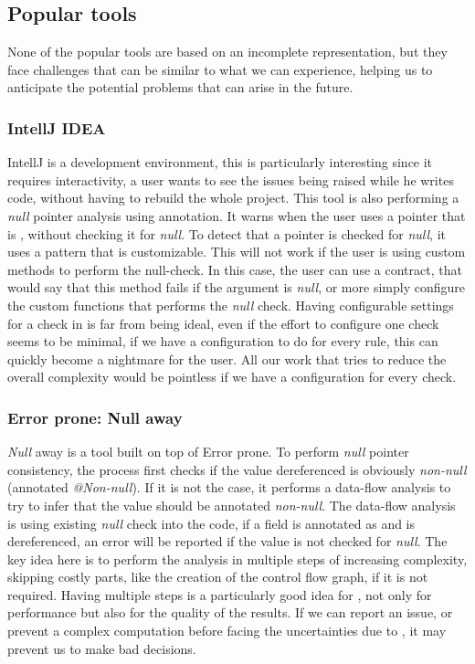 \subsection{Popular tools}
\label{subsec:other_tools_features}

None of the popular tools are based on an incomplete representation, but they face challenges that can be similar to what we can experience, helping us to anticipate the potential problems that can arise in the future.

\subsubsection{IntellJ IDEA}
\label{subsubsec:intellj_idea}

IntellJ is a development environment, this is particularly interesting since it requires interactivity, a user wants to see the issues being raised while he writes code, without having to rebuild the whole project. 
This tool is also performing a \emph{null} pointer analysis using annotation. 
It warns when the user uses a pointer that is \nullable{}, without checking it for \emph{null}. 
To detect that a pointer is checked for \emph{null}, it uses a pattern that is customizable. 
This will not work if the user is using custom methods to perform the null-check. 
In this case, the user can use a contract, that would say that this method fails if the argument is \emph{null}, or more simply configure the custom functions that performs the \emph{null} check.\newline
Having configurable settings for a check in \slang{} is far from being ideal, even if the effort to configure one check seems to be minimal, if we have a configuration to do for every rule, this can quickly become a nightmare for the user. 
All our work that tries to reduce the overall complexity would be pointless if we have a configuration for every check.


\subsubsection{Error prone: Null away}
\label{subsubsec:error_prone}

\emph{Null} away is a tool built on top of Error prone. 
To perform \emph{null} pointer consistency, the process first checks if the value dereferenced is obviously \emph{non-null} (annotated \emph{@Non-null}). 
If it is not the case, it performs a data-flow analysis to try to infer that the value should be annotated \emph{non-null}. 
The data-flow analysis is using existing \emph{null} check into the code, if a field is annotated as \nullable{} and is dereferenced, an error will be reported if the value is not checked for \emph{null}. \newline
The key idea here is to perform the analysis in multiple steps of increasing complexity, skipping costly parts, like the creation of the control flow graph, if it is not required.
Having multiple steps is a particularly good idea for \slang{}, not only for performance but also for the quality of the results. 
If we can report an issue, or prevent a complex computation before facing the uncertainties due to \slang{}, it may prevent us to make bad decisions.


